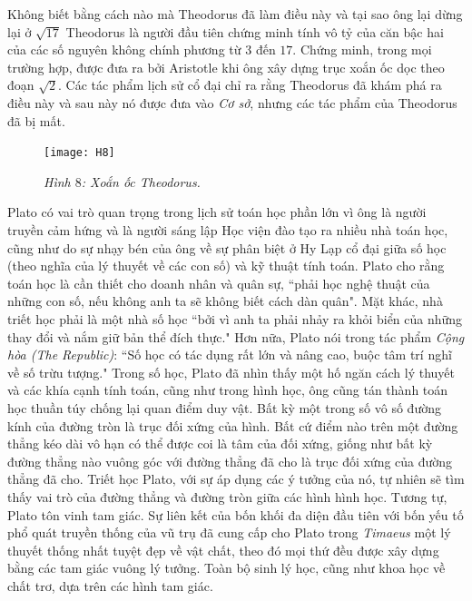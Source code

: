 \begin{multicols}{2}
		\vskip 0.1cm
		Không biết bằng cách nào mà Theodorus đã làm điều này và tại sao ông lại dừng lại ở $\sqrt{17}$ 
		\vskip 0.1cm
		Theodorus là người đầu tiên chứng minh tính vô tỷ của căn bậc hai của các số nguyên không chính phương từ $3$ đến $17$.	 
		\vskip 0.1cm
		Chứng minh, trong mọi trường hợp, được đưa ra bởi Aristotle khi ông xây dựng trục xoắn ốc dọc theo đoạn $\sqrt{2}$. Các tác phẩm lịch sử cổ đại chỉ ra rằng Theodorus đã khám phá ra điều này và sau này nó được đưa vào \textit{Cơ sở}, nhưng các tác phẩm của Theodorus đã bị mất. 
		\begin{figure}[H]
				\vspace*{-5pt}
				\centering
				\captionsetup{labelformat= empty, justification=centering}
				\texttt{[image: H8]}
				\caption{\small\textit{\color{lichsutoanhoc}Hình $8$: Xoắn ốc Theodorus.}}
				\vspace*{-10pt}
			\end{figure}
		Plato có vai trò quan trọng trong lịch sử toán học phần lớn vì ông là người truyền cảm hứng và là người sáng lập Học viện đào tạo ra nhiều nhà toán học, cũng như do sự nhạy bén của ông về sự phân biệt ở Hy Lạp cổ đại giữa số học (theo nghĩa của lý thuyết về các con số) và kỹ thuật tính toán. 
		\vskip 0.1cm
		Plato cho rằng toán học là cần thiết cho doanh nhân và quân sự, ``phải học nghệ thuật của những con số, nếu không anh ta sẽ không biết cách dàn quân".
		\vskip 0.1cm
		Mặt khác, nhà triết học phải là một nhà số học ``bởi vì anh ta phải nhảy ra khỏi biển của những thay đổi và nắm giữ bản thể đích thực." Hơn nữa, Plato nói trong tác phẩm \textit{Cộng hòa (The Republic)}: ``Số học có tác dụng rất lớn và nâng cao, buộc tâm trí nghĩ về số trừu tượng."
		\vskip 0.1cm 
		Trong số học, Plato đã nhìn thấy một hố ngăn cách lý thuyết và các khía cạnh tính toán, cũng như trong hình học, ông cũng tán thành toán học thuần túy chống lại quan điểm duy vật.  
		\vskip 0.1cm
		Bất kỳ một trong số vô số đường kính của đường tròn là trục đối xứng của hình. Bất cứ điểm nào trên một đường thẳng kéo dài vô hạn có thể được coi là tâm của đối xứng, giống như bất kỳ đường thẳng nào vuông góc với đường thẳng đã cho là trục đối xứng của đường thẳng đã cho. Triết học Plato, với sự áp dụng các ý tưởng của nó, tự nhiên sẽ tìm thấy vai trò của đường thẳng và đường tròn giữa các hình hình học. Tương tự, Plato tôn vinh tam giác.
		\vskip 0.1cm 
		Sự liên kết của bốn khối đa diện đầu tiên với bốn yếu tố phổ quát truyền thống của vũ trụ đã cung cấp cho Plato trong \textit{Timaeus}  một lý thuyết thống nhất tuyệt đẹp về vật chất, theo đó mọi thứ đều được xây dựng bằng các tam giác vuông lý tưởng. Toàn bộ sinh lý học, cũng như khoa học về chất trơ, dựa trên các hình tam giác.

\end{multicols}
